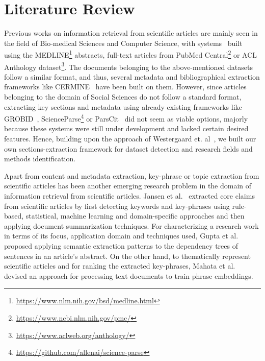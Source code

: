 \documentclass[runningheads]{llncs}
\begin{document}
	
	
	\setcounter{figure}{0}
	\setcounter{table}{0}
	
	\section{Literature Review}
	Previous works on information retrieval from scientific articles are mainly seen in the field of Bio-medical Sciences and Computer Science, with systems~\cite{DBLP:journals/ploscb/WestergaardSTJB18} built using the MEDLINE\footnote{\url{https://www.nlm.nih.gov/bsd/medline.html}} abstracts, full-text articles from PubMed Central\footnote{\url{https://www.ncbi.nlm.nih.gov/pmc/}} or ACL Anthology
	dataset\footnote{\url{https://www.aclweb.org/anthology/}}. The documents belonging to the above-mentioned datasets follow a similar format, and thus, several metadata and bibliographical extraction frameworks like CERMINE~\cite{tkaczyk2014cermine} have been built on them. However, since articles belonging to the domain of Social Sciences do not follow a standard format, extracting key sections and metadata using already existing frameworks like GROBID~\cite{lopez2009grobid}, ScienceParse\footnote{\url{https://github.com/allenai/science-parse}} or ParsCit~\cite{councill2008parscit} did not seem as viable options, majorly because these systems were still under development and lacked certain desired features. Hence, building upon the approach of Westergaard et. al~\cite{DBLP:journals/ploscb/WestergaardSTJB18}, we built our own sections-extraction framework for dataset detection and research fields and methods identification. 
	
	Apart from content and metadata extraction, key-phrase or topic extraction from scientific articles has been another emerging research problem in the domain of information retrieval from scientific articles. Jansen et al.~\cite{jansen2016extracting} extracted core claims from scientific articles by first detecting keywords and key-phrases using rule-based, statistical, machine learning and domain-specific approaches and then applying document summarization techniques. For characterizing a research work in terms of its focus, application domain and techniques used, Gupta et al.~\cite{gupta2011analyzing} proposed applying semantic extraction patterns to the dependency trees of sentences in an article's abstract. On the other hand, to thematically represent scientific articles and for ranking the extracted key-phrases,  Mahata et al.~\cite{mahata2018key2vec} devised an approach for processing text documents to train phrase embeddings. 
	
\end{document}
